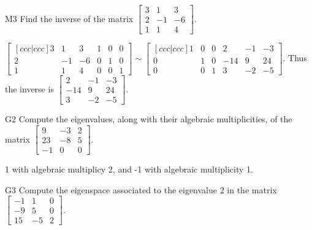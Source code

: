 \documentclass{sbgLAquiz}
\begin{document}
\begin{extract}\newpage\end{extract}
\begin{problem}{M3}
  Find the inverse of the matrix
  \(\begin{bmatrix}
    3 & 1 & 3  \\
    2 & -1 & -6  \\
    1 & 1 & 4
  \end{bmatrix}\).
\end{problem}
\begin{solution}
\(\begin{bmatrix}[ccc|ccc]
  3 & 1 & 3 & 1 & 0 & 0 \\
  2 & -1 & -6 & 0 & 1 & 0 \\
  1 & 1 & 4 & 0 & 0 & 1
\end{bmatrix}\sim\begin{bmatrix}[ccc|ccc]
  1 & 0 & 0 & 2 & -1 & -3  \\
  0 & 1 & 0 & -14 & 9 & 24  \\
  0 & 0 & 1 & 3 & -2 & -5
\end{bmatrix}\). Thus the inverse is
\(\begin{bmatrix}
  2 & -1 & -3  \\
  -14 & 9 & 24  \\
  3 & -2 & -5
\end{bmatrix}\).
\end{solution}


\begin{problem}{G2} 
Compute the eigenvalues, along with their algebraic multiplicities, of the matrix $ \begin{bmatrix} 9 & -3 & 2 \\ 23 & -8 & 5 \\  -1 & 0 & 0 \end{bmatrix}$.
\end{problem}
\begin{solution}
1 with algebraic multiplicy 2, and -1 with algebraic multiplicity 1.
\end{solution}

\begin{extract}\newpage\end{extract}
\begin{problem}{G3}
Compute the eigenspace associated to the eigenvalue $2$ in the matrix $\begin{bmatrix} -1 & 1 & 0 \\ -9 & 5 & 0 \\ 15 & -5 & 2 \end{bmatrix}$.
\end{problem}
\end{document}
